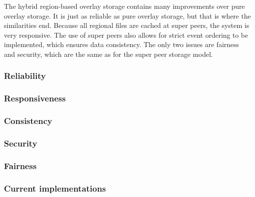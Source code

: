 \documentclass[10pt,a4paper,journal,cspaper,compsoc]{IEEEtran}
\begin{document}
The hybrid region-based overlay storage contains many improvements over pure overlay storage. It is just as
reliable as pure overlay storage, but that is where the similarities end. Because all regional files are cached at super peers, the system is very
responsive. The use of super peers also allows for strict event ordering to be implemented, which ensures data consistency. The only two issues are
fairness and security, which are the same as for the super peer storage model.

\subsubsection{Reliability}
\label{hybrid_storage_reliability}

\subsubsection{Responsiveness}

\subsubsection{Consistency}

\subsubsection{Security}

\subsubsection{Fairness}

\subsubsection{Current implementations}
\end{document}
